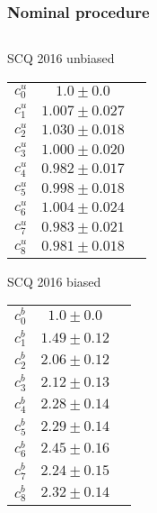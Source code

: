 \documentclass[aspectratio=43,9pt]{beamer}
\begin{document}
\begin{frame}[default] %
\frametitle{Nominal procedure}

\footnotesize

\begin{columns}[T]


  \begin{column}{0.25\textwidth}
    \begin{block}{SCQ 2016 unbiased} \centering
    \begin{tabular}{ccc}
      $c_0^u$ & $1.0   \pm 0.0  $ \\
      $c_1^u$ & $1.007 \pm 0.027$ \\
      $c_2^u$ & $1.030 \pm 0.018$ \\
      $c_3^u$ & $1.000 \pm 0.020$ \\
      $c_4^u$ & $0.982 \pm 0.017$ \\
      $c_5^u$ & $0.998 \pm 0.018$ \\
      $c_6^u$ & $1.004 \pm 0.024$ \\
      $c_7^u$ & $0.983 \pm 0.021$ \\
      $c_8^u$ & $0.981 \pm 0.018$ \\
    \end{tabular}
    \end{block}
    \begin{block}{SCQ 2016 biased} \centering
    \begin{tabular}{ccc}
      $c_0^b$ & $1.0  \pm 0.0 $ \\
      $c_1^b$ & $1.49 \pm 0.12$ \\
      $c_2^b$ & $2.06 \pm 0.12$ \\
      $c_3^b$ & $2.12 \pm 0.13$ \\
      $c_4^b$ & $2.28 \pm 0.14$ \\
      $c_5^b$ & $2.29 \pm 0.14$ \\
      $c_6^b$ & $2.45 \pm 0.16$ \\
      $c_7^b$ & $2.24 \pm 0.15$ \\
      $c_8^b$ & $2.32 \pm 0.14$ \\
    \end{tabular}
    \end{block}
  \end{column}


\end{columns}
\end{frame}
\end{document}
